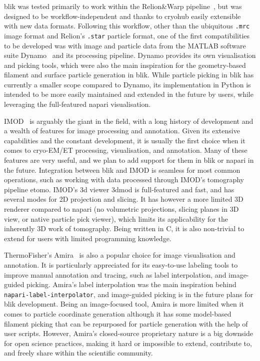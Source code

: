 \vspace{\baselineskip}

blik was tested primarily to work within the Relion\&Warp pipeline~\cite{scheresRELIONImplementationBayesian2012,tegunovMultiparticleCryoEMRefinement2021,burtFlexibleFrameworkMultiparticle2021}, but was designed to be workflow-independent and thanks to cryohub easily extensible with new data formats. Following this workflow, other than the ubiquitous \texttt{.mrc} image format and Relion's \texttt{.star} particle format, one of the first compatibilities to be developed was with image and particle data from the MATLAB software suite Dynamo~\cite{castano-diezDynamoFlexibleUserfriendly2012} and its processing pipeline. Dynamo provides its own visualisation and picking tools, which were also the main inspiration for the geometry-based filament and surface particle generation in blik. While particle picking in blik has currently a smaller scope compared to Dynamo, its implementation in Python is intended to be more easily maintained and extended in the future by users, while leveraging the full-featured napari visualisation.

IMOD~\cite{kremerComputerVisualizationThreeDimensional1996} is arguably the giant in the field, with a long history of development and a wealth of features for image processing and annotation. Given its extensive capabilities and the constant development, it is usually the first choice when it comes to cryo-EM/ET processing, visualisation, and annotation. Many of these features are very useful, and we plan to add support for them in blik or napari in the future. Integration between blik and IMOD is seamless for most common operations, such as working with data processed through IMOD's tomography pipeline etomo. IMOD's 3d viewer 3dmod is full-featured and fast, and has several modes for 2D projection and slicing. It has however a more limited 3D renderer compared to napari (no volumetric projections, slicing planes in 3D view, or native particle pick viewer), which limits its applicability for the inherently 3D work of tomography. Being written in C, it is also non-trivial to extend for users with limited programming knowledge.

ThermoFisher's Amira~\cite{thermofisherAmiraSoftwareLife1999} is also a popular choice for image visualisation and annotation. It is particularly appreciated for its easy-to-use labeling tools to improve manual annotation and tracing, such as label interpolation, and image-guided picking. Amira's label interpolation was the main inspiration behind \texttt{napari-label-interpolator}, and image-guided picking is in the future plans for blik development. Being an image-focused tool, Amira is more limited when it comes to particle coordinate generation although it has some model-based filament picking that can be repurposed for particle generation with the help of user scripts. However, Amira's closed-source proprietary nature is a big downside for open science practices, making it hard or impossible to extend, contribute to, and freely share within the scientific community.

